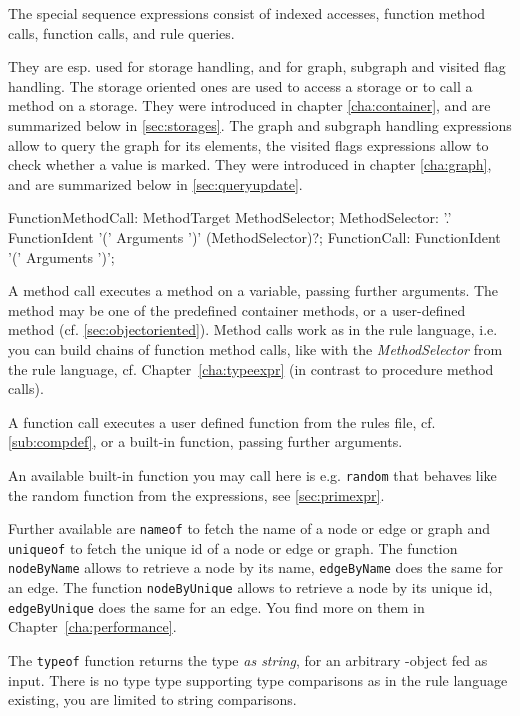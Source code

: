 The special sequence expressions consist of indexed accesses, function method calls, function calls, and rule queries.

They are esp. used for storage handling, and for graph, subgraph and visited flag handling.
The storage oriented ones are used to access a storage or to call a method on a storage. 
They were introduced in chapter \ref{cha:container}, and are summarized below in \ref{sec:storages}.
The graph and subgraph handling expressions allow to query the graph for its elements, the visited flags expressions allow to check whether a value is marked.
They were introduced in chapter \ref{cha:graph}, and are summarized below in \ref{sec:queryupdate}.

\begin{rail} 
	FunctionMethodCall: MethodTarget MethodSelector;
	MethodSelector: '.' FunctionIdent '(' Arguments ')' (MethodSelector)?;
	FunctionCall: FunctionIdent '(' Arguments ')';
\end{rail}

A method call executes a method on a variable, passing further arguments.
The method may be one of the predefined container methods, or a user-defined method (cf. \ref{sec:objectoriented}).
Method calls work as in the rule language, i.e. you can build chains of function method calls, like with the \emph{MethodSelector} from the rule language, cf. Chapter~\ref{cha:typeexpr} (in contrast to procedure method calls).

A function call executes a user defined function from the rules file, cf. \ref{sub:compdef},
or a built-in function, passing further arguments.

An available built-in function you may call here is e.g. \texttt{random} that behaves like the random function from the expressions, see \ref{sec:primexpr}.

Further available are \texttt{nameof} to fetch the name of a node or edge or graph and \texttt{uniqueof} to fetch the unique id of a node or edge or graph.
The function \texttt{nodeByName} allows to retrieve a node by its name, \texttt{edgeByName} does the same for an edge.
The function \texttt{nodeByUnique} allows to retrieve a node by its unique id, \texttt{edgeByUnique} does the same for an edge.
You find more on them in Chapter~\ref{cha:performance}.

The \texttt{typeof} function returns the type \emph{as string}, for an arbitrary \GrG-object fed as input.
There is no type type supporting type comparisons as in the rule language existing, you are limited to string comparisons.

